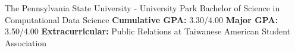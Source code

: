 \begin{education}
					{The Pennsylvania State University - University Park}
					{Bachelor of Science in Computational Data Science}
	\educationsection{}
	                {\textbf{Cumulative GPA:} 3.30/4.00}
	\educationsection{}
	                {\textbf{Major GPA:} 3.50/4.00}
    \educationsection{}
                    {\textbf{Extracurricular:} Public Relations at Taiwanese American Student Association}
\end{education}